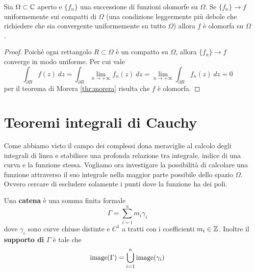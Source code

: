 \begin{corollary}
  Sia $\Omega \subset \mathbb{C}$ aperto e $\{f_n\}$ una successione di funzioni
  olomorfe su $\Omega$. Se $\{f_n\} \to f$ uniformemente sui compatti di
  $\Omega$ (una condizione leggermente più debole che richiedere che sia
  convergente uniformemente su tutto $\Omega$) allora $f$ è olomorfa su
  $\Omega$.  
  \label{cor:trasmissione-olomorfismo-successione}
\end{corollary}
\begin{proof}
  Poiché ogni rettangolo $R \subset \Omega$ è un compatto su $\Omega$,
  allora $\{f_n\} \to f$ converge in modo uniforme. Per cui vale
  \begin{equation*}
    \int_{\partial R} f(z)\ dz = \int_{\partial R} \lim_{n\to+\infty}f_n(z)
    \ dz = \lim_{n\to+\infty} \int_{\partial R} f_n(z)\ dz = 0 
  \end{equation*}
  per il teorema di Morera \ref{thr:morera} risulta che $f$ è olomorfa.
\end{proof}

\section{Teoremi integrali di Cauchy}

Come abbiamo visto il campo dei complessi dona meraviglie al calcolo degli
integrali di linea e stabilisce una profonda relazione tra integrale, indice
di una curva e la funzione stessa. Vogliamo ora investigare la
possibilità di calcolare una funzione attraverso il suo integrale nella
maggior parte possibile dello spazio $\Omega$. Ovvero cercare di escludere
solamente i punti dove la funzione ha dei poli.

\begin{definition}
    \label{def:catena-di-curve-chiuse}
    Una \textbf{catena} è una somma finita formale 
    \begin{equation*}
      \Gamma = \sum^n_{i=1} m_i \gamma_i
    \end{equation*}
    dove $\gamma_i$ sono curve chiuse distinte e $C^1$ a tratti con
    i coefficienti $m_i \in \mathbb{Z}$. Inoltre il \textbf{supporto di $\Gamma$}
    è tale che 
    \begin{equation*}
      \operatorname{image}(\Gamma) = \bigcup^n_{i=1} \operatorname{image}(\gamma_i)
    \end{equation*}
\end{definition}

